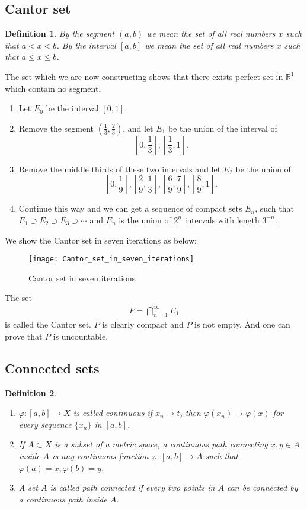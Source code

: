\documentclass[12pt,leqno]{amsart}
\newtheorem{definition}{Definition}[section]
\theoremstyle{definition}
\numberwithin{equation}{subsection}
\begin{document}
\subsection{Cantor set}
\begin{definition}
By the segment $(a,b)$ we mean the set of all real numbers $x$ such that $a<x<b$. By the interval $[a,b]$ we mean the set of all real numbers $x$ such that $a\leq x\leq b$.
\end{definition}
The set which we are now constructing shows that there exists perfect set in $\mathbb{R}^1$ which contain no segment. 
\begin{enumerate}
    \item Let $E_0$ be the interval $[0,1]$.
    \item Remove the segment $\left(\frac{1}{3},\frac{2}{3}\right)$, and let $E_1$ be the union of the interval of $$\left[0,\frac{1}{3}\right],\left[\frac{1}{3},1\right].$$
    \item Remove the middle thirds of these two intervals and let $E_2$ be the union of $$\left[0,\frac{1}{9}\right],\left[\frac{2}{9},\frac{1}{3}\right],\left[\frac{6}{9},\frac{7}{9}\right],\left[\frac{8}{9},1\right].$$
    \item Continue this way and we can get a sequence of compact sets $E_n$, such that $E_1\supset E_2\supset E_3\supset\cdots$ and $E_n$ is the union of $2^n$ intervals with length $3^{-n}$.
\end{enumerate}

We show the Cantor set in seven iterations as below:
\begin{figure}[h]
    \centering
    \texttt{[image: Cantor\_set\_in\_seven\_iterations]}
    \caption{Cantor set in seven iterations}
    \label{fig:Cantor_set}
\end{figure}

The set
\begin{align*}
    P = \bigcap^\infty_{n=1}E_1
\end{align*}
is called the Cantor set. $P$ is clearly compact and $P$ is not empty. And one can prove that $P$ is uncountable.

\medskip

\subsection{Connected sets}
\begin{definition}
~\begin{enumerate}
  \item $\varphi:[a,b]\to X$ is called continuous if $x_n\to t$, then $\varphi(x_n)\to\varphi(x)$ for every sequence $\{x_n\}$ in $[a,b]$. 
  \item If $A\subset X$ is a subset of a metric space, a continuous path connecting $x,y\in A$ inside $A$ is any continuous function $\varphi:[a,b]\to A$ such that $\varphi(a) = x, \varphi(b) = y$.
  \item A set $A$ is called path connected if every two points in $A$ can be connected by a continuous path inside $A$.
\end{enumerate}
\end{definition}
\end{document}
